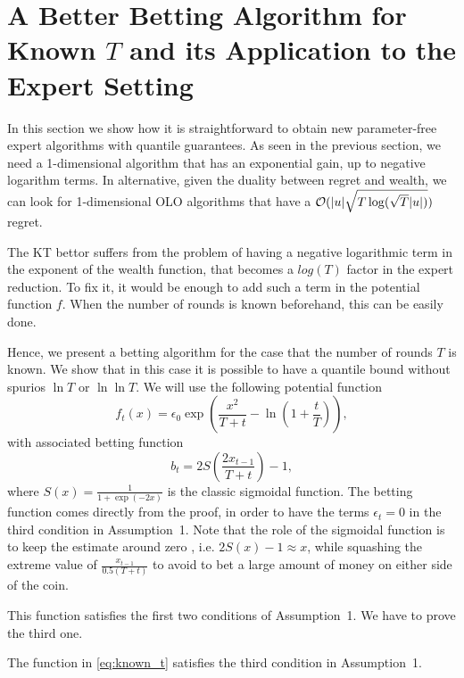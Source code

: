 \section{A Better Betting Algorithm for Known $T$ and its Application to the Expert Setting}

In this section we show how it is straightforward to obtain new parameter-free expert algorithms with quantile guarantees.
As seen in the previous section, we need a 1-dimensional algorithm that has an exponential gain, up to negative logarithm terms. In alternative, given the duality between regret and wealth, we can look for 1-dimensional \ac{OLO} algorithms that have a $\mathcal{O}(|u|\sqrt{T \log(\sqrt{T} |u|)})$ regret.

The \ac{KT} bettor suffers from the problem of having a negative logarithmic term in the exponent of the wealth function, that becomes a $log(T)$ factor in the expert reduction.
To fix it, it would be enough to add such a term in the potential function $f$. When the number of rounds is known beforehand, this can be easily done.

Hence, we present a betting algorithm for the case that the number of rounds $T$ is known. We show that in this case it is possible to have a quantile bound without spurios $\ln T$ or $\ln \ln T$.
We will use the following potential function
\begin{equation}
\label{eq:known_t}
f_t(x)=\epsilon_0 \exp\left(\frac{x^2}{T+t}-\ln\left(1+\frac{t}{T}\right)\right),
\end{equation}
with associated betting function
\[
b_t=2 S\left(\frac{2 x_{t-1}}{T+t}\right)-1,
\]
where $S(x)=\frac{1}{1+\exp(-2 x)}$ is the classic sigmoidal function.
The betting function comes directly from the proof, in order to have the terms $\epsilon_t=0$ in the third condition in Assumption~1.
Note that the role of the sigmoidal function is to keep the estimate around zero , i.e. $2 S(x)-1\approx x$, while squashing the extreme value of $\frac{x_{t-1}}{0.5 (T+t)}$ to avoid to bet a large amount of money on either side of the coin.

This function satisfies the first two conditions of Assumption~1.
We have to prove the third one.

\begin{theorem}
\label{theo:known_t}
The function in \eqref{eq:known_t} satisfies the third condition in Assumption~1.
\end{theorem}


